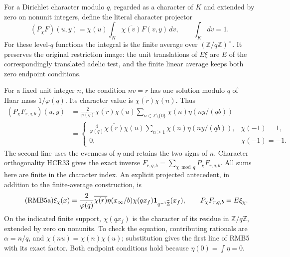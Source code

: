 For a Dirichlet character modulo $q$, regarded as a character
of $K$ and extended by zero on nonunit integers, define the
literal character projector
\begin{equation}\tag{RMB4}
 (P_\chi F)(u,y)=
       \chi(u)\int_K\overline{\chi(v)}F(v,y)\,dv,
 \qquad \int_Kdv=1.
\end{equation}
For these level-$q$ functions the integral is the finite
average over $(\mathbb Z/q\mathbb Z)^\times$. It preserves
the original restriction image: the unit translations of $E\xi$
are $E$ of the correspondingly translated adelic test, and
the finite linear average keeps both zero endpoint conditions.

For a fixed unit integer $n$, the condition $nv=r$ has one
solution modulo $q$ of Haar mass $1/\varphi(q)$. Its character
value is $\overline{\chi(r)}\chi(n)$. Thus
\begin{equation}\tag{RMB5}
 \begin{split}
 (P_\chi F_{r,q,b})(u,y)
 &=\frac{2}{\varphi(q)}\overline{\chi(r)}\chi(u)
       \sum_{n\in\mathbb Z\setminus\{0\}}
                \chi(n)\eta(ny/(qb))\\
 &=
 \begin{cases}
 \displaystyle
 \frac4{\varphi(q)}\overline{\chi(r)}\chi(u)
              \sum_{n\ge1}\chi(n)\eta(ny/(qb)),
                       &\chi(-1)=1,\\
 0,&\chi(-1)=-1.
 \end{cases}
 \end{split}
\end{equation}
The second line uses the evenness of $\eta$ and retains the
two signs of $n$. Character orthogonality HCR33 gives the
exact inverse $F_{r,q,b}=\sum_{\chi\bmod q}P_\chi F_{r,q,b}$.
All sums here are finite in the character index.
An explicit projected antecedent, in addition to the finite-average
construction, is
\begin{equation}\tag{RMB5a}
 \xi_\chi(x)=\frac2{\varphi(q)}\overline{\chi(r)}
       \eta(x_\infty/b)\chi(qx_f)
              {\bf1}_{q^{-1}\widehat{\mathbb Z}}(x_f),
 \qquad P_\chi F_{r,q,b}=E\xi_\chi.
\end{equation}
On the indicated finite support, $\chi(qx_f)$ is the character
of its residue in $\mathbb Z/q\mathbb Z$, extended by zero
on nonunits. To check the equation, contributing rationals
are $\alpha=n/q$, and $\chi(nu)=\chi(n)\chi(u)$;
substitution gives the first line of RMB5 with its exact factor.
Both endpoint conditions hold because $\eta(0)=\int\eta=0$.


